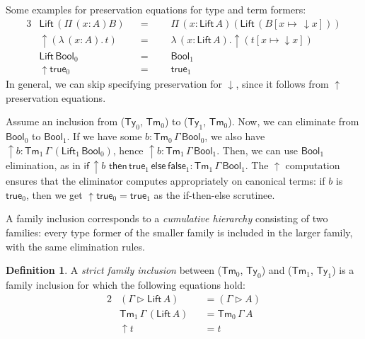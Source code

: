 \documentclass[a4paper,UKenglish,cleveref, autoref, thm-restate]{lipics-v2021}
\theoremstyle{remark}
\theoremstyle{definition}
\newtheorem{mydefinition}{Definition}
\newcommand{\Ty}{\mathsf{Ty}}
\newcommand{\Tm}{\mathsf{Tm}}
\newcommand{\ext}{\triangleright}
\newcommand{\Bool}{\mathsf{Bool}}
\newcommand{\true}{\mathsf{true}}
\newcommand{\false}{\mathsf{false}}
\newcommand{\up}{\uparrow}
\newcommand{\down}{\downarrow}
\newcommand{\Lift}{\mathsf{Lift}}
\begin{document}
\noindent Some examples for preservation equations for type and term formers:
\begin{alignat*}{3}
  & \Lift\,(\Pi\,(x : A) B)   && =\,\,\,\,&& \Pi\,(x : \Lift\,A)(\Lift\, (B[x \mapsto\,\down\!x]))\\
  & \up(\lambda\,(x : A).\,t) && =&& \lambda\,(x : \Lift\,A).\up(t[x\mapsto\down\!x])\\
  & \Lift\,\Bool_0            && =&& \Bool_1\\
  & \up\true_0                && =&& \true_1
\end{alignat*}
In general, we can skip specifying preservation for $\down$, since it follows from $\up$ preservation
equations.

Assume an inclusion from ($\Ty_0$, $\Tm_0$) to ($\Ty_1$, $\Tm_0$). Now, we can
eliminate from $\Bool_0$ to $\Bool_1$. If we have some $b :
\Tm_0\,\Gamma\,\Bool_0$, we also have $\up\!b :
\Tm_1\,\Gamma\,(\Lift_1\,\Bool_0)$, hence $\up\!b :
\Tm_1\,\Gamma\,\Bool_1$. Then, we can use $\Bool_1$ elimination, as in
$\mathsf{if}\,\up\!b\,\,\mathsf{then}\,\true_1\,\mathsf{else}\,\false_1 :
\Tm_1\,\Gamma\,\Bool_1$. The $\up$ computation ensures that the eliminator
computes appropriately on canonical terms: if $b$ is $\true_0$, then we get
$\up\!\true_0 = \true_1$ as the if-then-else scrutinee.

A family inclusion corresponds to a \emph{cumulative hierarchy} consisting of
two families: every type former of the smaller family is included in the larger
family, with the same elimination rules.

\begin{mydefinition}\label{def:strict_inclusion}
A \emph{strict family inclusion} between ($\Tm_0$, $\Ty_0$) and ($\Tm_1$,
$\Ty_1$) is a family inclusion for which the following equations hold:
\begin{alignat}{2}
  & (\Gamma \ext \Lift\,A) &&= (\Gamma \ext A)     \label{eq:cumcon}    \\
  & \Tm_1\,\Gamma\,(\Lift\,A) &&= \Tm_0\,\Gamma\,A  \label{eq:cumtm}     \\
  & \up\!t &&= t                                    \label{eq:cumlift}
\end{alignat}

\end{mydefinition}
\end{document}
